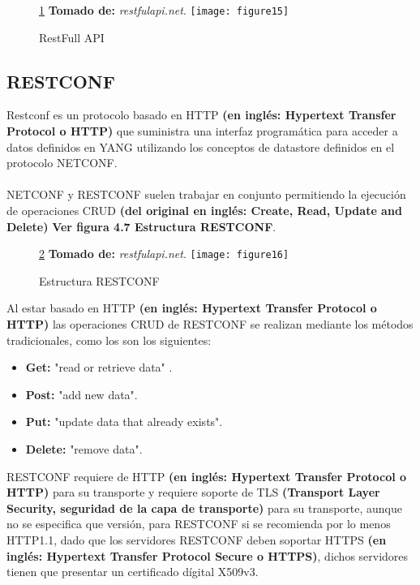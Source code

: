 \begin{figure}[htbp]
 \ref{fig:restfulapi} \textbf{Tomado de:} \textit{restfulapi.net}.
  \centering
    {\texttt{[image: figure15]}}%
  \caption{RestFull API}
  \label{fig:restfulapi}
\end{figure}

\subsection{RESTCONF}

Restconf es un protocolo basado en HTTP \textbf{(en inglés: Hypertext Transfer Protocol o HTTP)} que suministra una interfaz programática para acceder a datos definidos en YANG utilizando los conceptos de datastore definidos en el protocolo NETCONF.
\\
\\
NETCONF y RESTCONF suelen trabajar en conjunto permitiendo la ejecución de operaciones CRUD \textbf{(del original en inglés: Create, Read, Update and Delete)} \textbf{Ver figura 4.7 Estructura RESTCONF}.
\begin{figure}[htbp]
\ref{fig:restfulapi2} \textbf{Tomado de:} \textit{restfulapi.net}.
  \centering
    {\texttt{[image: figure16]}}%
  \caption{Estructura RESTCONF}
  \label{fig:restfulapi2}
\end{figure}
Al estar basado en HTTP  \textbf{(en inglés: Hypertext Transfer Protocol o HTTP)} las operaciones CRUD de RESTCONF se realizan mediante los métodos tradicionales, como los son los siguientes:
\begin{itemize}
\item\textbf{Get:} "read or retrieve data"	.
\item\textbf{Post:} "add new data".
\item\textbf{Put:} "update data that already exists".
\item\textbf{Delete:} "remove data".
\end{itemize}

RESTCONF requiere de HTTP \textbf{(en inglés: Hypertext Transfer Protocol o HTTP)} para su transporte y requiere soporte de TLS \textbf{(Transport Layer Security, seguridad de la capa de transporte)} para su transporte, aunque no se especifica que versión, para RESTCONF si se recomienda por lo menos HTTP1.1, dado que los servidores RESTCONF deben soportar HTTPS \textbf{(en inglés: Hypertext Transfer Protocol Secure o HTTPS)}, dichos servidores tienen que presentar un certificado dígital X509v3.

